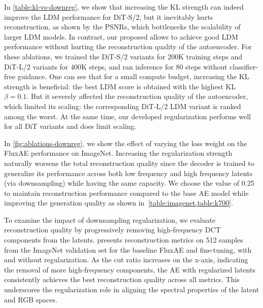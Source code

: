 In \cref{table:kl-vs-downreg}, we show that increasing the KL strength can indeed improve the LDM performance for DiT-S/2, but it inevitably hurts reconstruction, as shown by the PSNRs, which bottlenecks the scalability of larger LDM models.
In contrast, our proposed \regname allows to achieve good LDM performance without hurting the reconstruction quality of the autoencoder.
For these ablations, we trained the DiT-S/2 variants for 200K training steps and DiT-L/2 variants for 400K steps, and ran inference for 80 steps without classifier-free guidance.
One can see that for a small compute budget, increasing the KL strength is beneficial: the best LDM score is obtained with the highest KL $\beta = 0.1$.
But it severely affected the reconstruction quality of the autoencoder, which limited its scaling: the corresponding DiT-L/2 LDM variant is ranked among the worst.
At the same time, our developed regularization performs well for all DiT variants and does limit scaling.

In \cref{fig:ablations-downreg}, we show the effect of varying the loss weight on the FluxAE performance on ImageNet.
Increasing the \regshortname regularization strength naturally worsens the total reconstruction quality since the decoder is trained to generalize its performance across both low frequency and high frequency latents (via downsampling) while having the same capacity. We choose the value of 0.25 to maintain reconstruction performance compared to the base AE model while improving the generation quality as shown in~\cref{table:imagenet,table:k700}.



 To examine the impact of downsampling regularization, we evaluate reconstruction quality by progressively removing high-frequency DCT components from the latents.  presents reconstruction metrics on 512 samples from the ImageNet validation set for the baseline FluxAE and fine-tuning, with and without regularization. As the cut ratio increases on the x-axis, indicating the removal of more high-frequency components, the AE with regularized latents consistently achieves the best reconstruction quality across all metrics.
This underscores the regularization role in aligning the spectral properties of the latent and RGB spaces.

